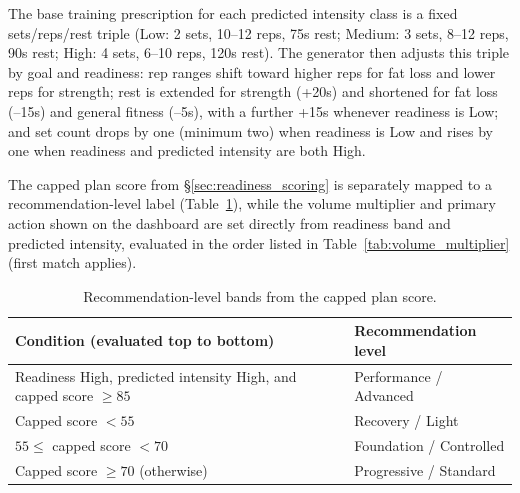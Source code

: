 \documentclass{aitthesis}
\begin{document}
The base training prescription for each predicted intensity class is a fixed sets/reps/rest triple (Low: 2 sets, 10--12 reps, 75s rest; Medium: 3 sets, 8--12 reps, 90s rest; High: 4 sets, 6--10 reps, 120s rest). The generator then adjusts this triple by goal and readiness: rep ranges shift toward higher reps for fat loss and lower reps for strength; rest is extended for strength (+20s) and shortened for fat loss (--15s) and general fitness (--5s), with a further +15s whenever readiness is Low; and set count drops by one (minimum two) when readiness is Low and rises by one when readiness and predicted intensity are both High.

The capped plan score from \S\ref{sec:readiness_scoring} is separately mapped to a recommendation-level label (Table~\ref{tab:recommendation_levels}), while the volume multiplier and primary action shown on the dashboard are set directly from readiness band and predicted intensity, evaluated in the order listed in Table~\ref{tab:volume_multiplier} (first match applies).

\begin{table}[H]
\centering
\small
\caption{Recommendation-level bands from the capped plan score.}
\label{tab:recommendation_levels}
\begin{tabularx}{\linewidth}{Xl}
\toprule
\textbf{Condition (evaluated top to bottom)} & \textbf{Recommendation level} \\
\midrule
Readiness High, predicted intensity High, and capped score $\geq 85$ & Performance / Advanced \\
Capped score $<55$ & Recovery / Light \\
$55 \leq$ capped score $<70$ & Foundation / Controlled \\
Capped score $\geq 70$ (otherwise) & Progressive / Standard \\
\bottomrule
\end{tabularx}
\end{table}
\end{document}
